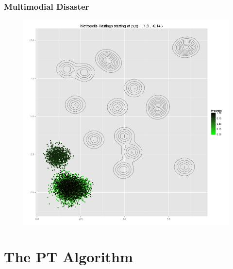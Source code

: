 \documentclass[xetex]{beamer}
\begin{document}
	\begin{frame}[t]\frametitle{Multimodial Disaster}

		\begin{center}
			\begin{figure}
				\includegraphics[height=.8\textheight, keepaspectratio]{./picts/MH_simululation_10000_steps.png}
			\end{figure}	
		\end{center}
 	
	\end{frame}

\section{The PT Algorithm}
\end{document}
